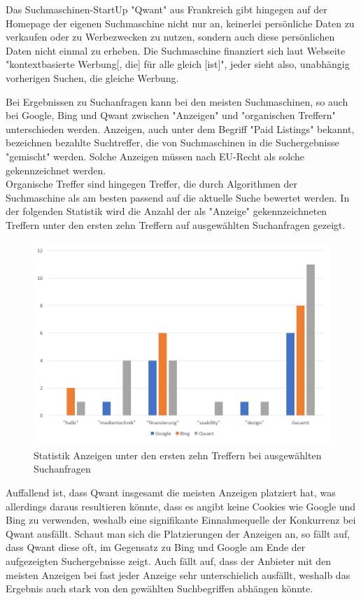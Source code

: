 \documentclass[11pt]{report}
\begin{document}
    Das Suchmaschinen-StartUp "Qwant" aus Frankreich gibt hingegen auf der Homepage der eigenen Suchmaschine nicht nur an, keinerlei persönliche Daten zu verkaufen oder zu Werbezwecken zu nutzen, sondern auch diese persönlichen Daten nicht einmal zu erheben.
    Die Suchmaschine finanziert sich laut Webseite "kontextbasierte Werbung[, die] für alle gleich [ist]"\cite{[QWA22]}, jeder sieht also, unabhängig vorherigen Suchen, die gleiche Werbung.

    Bei Ergebnissen zu Suchanfragen kann bei den meisten Suchmaschinen, so auch bei Google, Bing und Qwant zwischen "Anzeigen" und "organischen Treffern" unterschieden werden.
    Anzeigen, auch unter dem Begriff "Paid Listings" bekannt, bezeichnen bezahlte Suchtreffer, die von Suchmaschinen in die Suchergebnisse "gemischt" werden.
    Solche Anzeigen müssen nach EU-Recht als solche gekennzeichnet werden.\\
    Organische Treffer sind hingegen Treffer, die durch Algorithmen der Suchmaschine als am besten passend auf die aktuelle Suche bewertet werden.
    In der folgenden Statistik wird die Anzahl der als "Anzeige" gekennzeichneten Treffern unter den ersten zehn Treffern auf ausgewählten Suchanfragen gezeigt.\cite{[LEW18]}\\
    \begin{figure}[h]
        \centering
        \includegraphics[width=120mm]{images/statistic_adverts}
        \caption{Statistik Anzeigen unter den ersten zehn Treffern bei ausgewählten Suchanfragen}
        \label{fig:statisticAdverts}
    \end{figure}
    Auffallend ist, dass Qwant insgesamt die meisten Anzeigen platziert hat, was allerdings daraus resultieren könnte, dass es angibt keine Cookies wie Google und Bing zu verwenden, weshalb eine signifikante Einnahmequelle der Konkurrenz bei Qwant ausfällt.
    Schaut man sich die Platzierungen der Anzeigen an, so fällt auf, dass Qwant diese oft, im Gegensatz zu Bing und Google am Ende der aufgezeigten Suchergebnisse zeigt.
    Auch fällt auf, dass der Anbieter mit den meisten Anzeigen bei fast jeder Anzeige sehr unterschielich ausfällt, weshalb das Ergebnis auch stark von den gewählten Suchbegriffen abhängen könnte.\\
\end{document}
